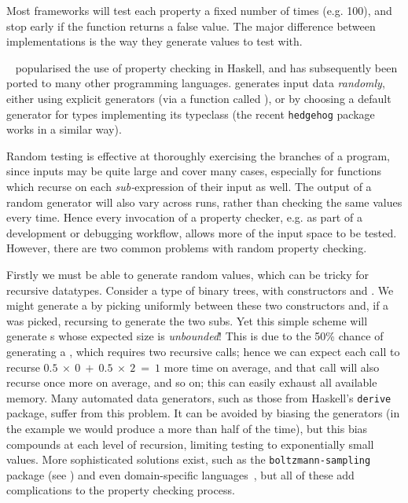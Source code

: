 Most frameworks will test each property a fixed number of times (e.g. 100), and
stop early if the function returns a false value. The major difference between
implementations is the way they generate values to test with.

\quickcheck{}~\cite{claessen2011quickcheck} popularised the use of
property checking in Haskell, and has subsequently been ported to many other
programming languages. \quickcheck{} generates input data \emph{randomly},
either using explicit generators (via a function called ), or by
choosing a default generator for types implementing its 
typeclass (the recent \texttt{hedgehog} package works in a similar way\iffalse
\cite{TODO} \fi).

Random testing is effective at thoroughly exercising the branches of a program,
since inputs may be quite large and cover many cases, especially for functions
which recurse on each \emph{sub-}expression of their input as well. The output
of a random generator will also vary across runs, rather than checking the same
values every time. Hence every invocation of a property checker, e.g. as part of
a development or debugging workflow, allows more of the input space to be
tested. However, there are two common problems with random property checking.

Firstly we must be able to generate random values, which can be tricky for
recursive datatypes. Consider a type of binary trees, with constructors
 and . We might
generate a  by picking uniformly between these two constructors
and, if a  was picked, recursing to generate the two
subs. Yet this simple scheme will generate s whose
expected size is \emph{unbounded}! This is due to the 50\% chance of generating
a , which requires two recursive calls; hence we can expect each
call to recurse $0.5~\times~0~+~0.5~\times~2~=~1$ more time on average, and that call will also
recurse once more on average, and so on; this can easily exhaust all available
memory. Many automated data generators, such as those from Haskell's
\texttt{derive} package, suffer from this problem. It can be avoided by biasing
the generators (in the  example we would produce a 
more than half of the time), but this bias compounds at each level of recursion,
limiting testing to exponentially small values. More sophisticated solutions
exist, such as the \texttt{boltzmann-sampling} package (see
\cite{duchon2004boltzmann}) and even domain-specific
languages~\cite{lampropoulos2017beginner}, but all of these add complications to
the property checking process.


